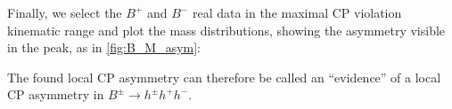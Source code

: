 Finally, we select the $B^{+}$ and $B^{-}$ real data in the maximal CP violation kinematic range and plot the mass distributions, showing the asymmetry visible in the peak, as in \autoref{fig:B_M_asym}:

\begin{figure}[H]
    \centering
    \caption{} %
    \label{fig:B_M_asym}
\end{figure}

The found local CP asymmetry can therefore be called an \enquote{evidence} of a local CP asymmetry in $B^{\pm} \rightarrow h^{\pm} h^{+} h^{-}$.

